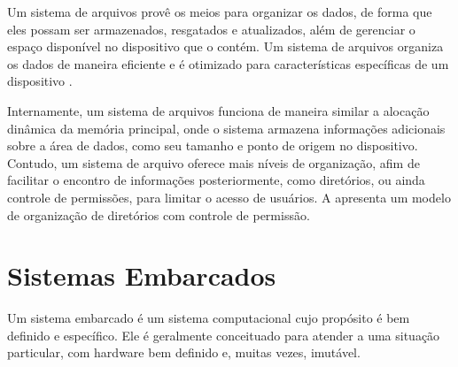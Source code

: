 Um sistema de arquivos provê os meios para organizar os dados, de forma que eles possam ser armazenados, resgatados e atualizados, além de gerenciar o espaço disponível no dispositivo que o contém. Um sistema de arquivos organiza os dados de maneira eficiente e é otimizado para características específicas de um dispositivo \cite{file_system}.

Internamente, um sistema de arquivos funciona de maneira similar a alocação dinâmica da memória principal, onde o sistema armazena informações adicionais sobre a área de dados, como seu tamanho e ponto de origem no dispositivo. Contudo, um sistema de arquivo oferece mais níveis de organização, afim de facilitar o encontro de informações posteriormente, como diretórios, ou ainda controle de permissões, para limitar o acesso de usuários. A  apresenta um modelo de organização de diretórios com controle de permissão.


%

\section{Sistemas Embarcados}

Um sistema embarcado é um sistema computacional cujo propósito é bem definido e específico. Ele é geralmente conceituado para atender a uma situação particular, com hardware bem definido e, muitas vezes, imutável.

